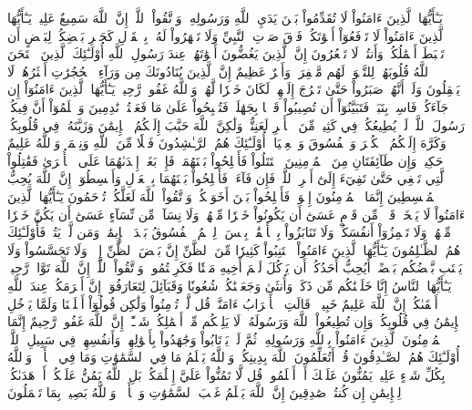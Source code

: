 يَـٰٓأَيُّهَا ٱلَّذِينَ ءَامَنُواْ لَا تُقَدِّمُواْ بَيۡنَ يَدَيِ ٱللَّهِ وَرَسُولِهِۦۖ وَٱتَّقُواْ ٱللَّهَۚ إِنَّ ٱللَّهَ سَمِيعٌ عَلِيمٞ
يَـٰٓأَيُّهَا ٱلَّذِينَ ءَامَنُواْ لَا تَرۡفَعُوٓاْ أَصۡوَٰتَكُمۡ فَوۡقَ صَوۡتِ ٱلنَّبِيِّ وَلَا تَجۡهَرُواْ لَهُۥ بِٱلۡقَوۡلِ كَجَهۡرِ بَعۡضِكُمۡ لِبَعۡضٍ أَن تَحۡبَطَ أَعۡمَٰلُكُمۡ وَأَنتُمۡ لَا تَشۡعُرُونَ
إِنَّ ٱلَّذِينَ يَغُضُّونَ أَصۡوَٰتَهُمۡ عِندَ رَسُولِ ٱللَّهِ أُوْلَـٰٓئِكَ ٱلَّذِينَ ٱمۡتَحَنَ ٱللَّهُ قُلُوبَهُمۡ لِلتَّقۡوَىٰۚ لَهُم مَّغۡفِرَةٞ وَأَجۡرٌ عَظِيمٌ
إِنَّ ٱلَّذِينَ يُنَادُونَكَ مِن وَرَآءِ ٱلۡحُجُرَٰتِ أَكۡثَرُهُمۡ لَا يَعۡقِلُونَ
وَلَوۡ أَنَّهُمۡ صَبَرُواْ حَتَّىٰ تَخۡرُجَ إِلَيۡهِمۡ لَكَانَ خَيۡرٗا لَّهُمۡۚ وَٱللَّهُ غَفُورٞ رَّحِيمٞ
يَـٰٓأَيُّهَا ٱلَّذِينَ ءَامَنُوٓاْ إِن جَآءَكُمۡ فَاسِقُۢ بِنَبَإٖ فَتَبَيَّنُوٓاْ أَن تُصِيبُواْ قَوۡمَۢا بِجَهَٰلَةٖ فَتُصۡبِحُواْ عَلَىٰ مَا فَعَلۡتُمۡ نَٰدِمِينَ
وَٱعۡلَمُوٓاْ أَنَّ فِيكُمۡ رَسُولَ ٱللَّهِۚ لَوۡ يُطِيعُكُمۡ فِي كَثِيرٖ مِّنَ ٱلۡأَمۡرِ لَعَنِتُّمۡ وَلَٰكِنَّ ٱللَّهَ حَبَّبَ إِلَيۡكُمُ ٱلۡإِيمَٰنَ وَزَيَّنَهُۥ فِي قُلُوبِكُمۡ وَكَرَّهَ إِلَيۡكُمُ ٱلۡكُفۡرَ وَٱلۡفُسُوقَ وَٱلۡعِصۡيَانَۚ أُوْلَـٰٓئِكَ هُمُ ٱلرَّـٰشِدُونَ
فَضۡلٗا مِّنَ ٱللَّهِ وَنِعۡمَةٗۚ وَٱللَّهُ عَلِيمٌ حَكِيمٞ
وَإِن طَآئِفَتَانِ مِنَ ٱلۡمُؤۡمِنِينَ ٱقۡتَتَلُواْ فَأَصۡلِحُواْ بَيۡنَهُمَاۖ فَإِنۢ بَغَتۡ إِحۡدَىٰهُمَا عَلَى ٱلۡأُخۡرَىٰ فَقَٰتِلُواْ ٱلَّتِي تَبۡغِي حَتَّىٰ تَفِيٓءَ إِلَىٰٓ أَمۡرِ ٱللَّهِۚ فَإِن فَآءَتۡ فَأَصۡلِحُواْ بَيۡنَهُمَا بِٱلۡعَدۡلِ وَأَقۡسِطُوٓاْۖ إِنَّ ٱللَّهَ يُحِبُّ ٱلۡمُقۡسِطِينَ
إِنَّمَا ٱلۡمُؤۡمِنُونَ إِخۡوَةٞ فَأَصۡلِحُواْ بَيۡنَ أَخَوَيۡكُمۡۚ وَٱتَّقُواْ ٱللَّهَ لَعَلَّكُمۡ تُرۡحَمُونَ
يَـٰٓأَيُّهَا ٱلَّذِينَ ءَامَنُواْ لَا يَسۡخَرۡ قَوۡمٞ مِّن قَوۡمٍ عَسَىٰٓ أَن يَكُونُواْ خَيۡرٗا مِّنۡهُمۡ وَلَا نِسَآءٞ مِّن نِّسَآءٍ عَسَىٰٓ أَن يَكُنَّ خَيۡرٗا مِّنۡهُنَّۖ وَلَا تَلۡمِزُوٓاْ أَنفُسَكُمۡ وَلَا تَنَابَزُواْ بِٱلۡأَلۡقَٰبِۖ بِئۡسَ ٱلِٱسۡمُ ٱلۡفُسُوقُ بَعۡدَ ٱلۡإِيمَٰنِۚ وَمَن لَّمۡ يَتُبۡ فَأُوْلَـٰٓئِكَ هُمُ ٱلظَّـٰلِمُونَ
يَـٰٓأَيُّهَا ٱلَّذِينَ ءَامَنُواْ ٱجۡتَنِبُواْ كَثِيرٗا مِّنَ ٱلظَّنِّ إِنَّ بَعۡضَ ٱلظَّنِّ إِثۡمٞۖ وَلَا تَجَسَّسُواْ وَلَا يَغۡتَب بَّعۡضُكُم بَعۡضًاۚ أَيُحِبُّ أَحَدُكُمۡ أَن يَأۡكُلَ لَحۡمَ أَخِيهِ مَيۡتٗا فَكَرِهۡتُمُوهُۚ وَٱتَّقُواْ ٱللَّهَۚ إِنَّ ٱللَّهَ تَوَّابٞ رَّحِيمٞ
يَـٰٓأَيُّهَا ٱلنَّاسُ إِنَّا خَلَقۡنَٰكُم مِّن ذَكَرٖ وَأُنثَىٰ وَجَعَلۡنَٰكُمۡ شُعُوبٗا وَقَبَآئِلَ لِتَعَارَفُوٓاْۚ إِنَّ أَكۡرَمَكُمۡ عِندَ ٱللَّهِ أَتۡقَىٰكُمۡۚ إِنَّ ٱللَّهَ عَلِيمٌ خَبِيرٞ
۞قَالَتِ ٱلۡأَعۡرَابُ ءَامَنَّاۖ قُل لَّمۡ تُؤۡمِنُواْ وَلَٰكِن قُولُوٓاْ أَسۡلَمۡنَا وَلَمَّا يَدۡخُلِ ٱلۡإِيمَٰنُ فِي قُلُوبِكُمۡۖ وَإِن تُطِيعُواْ ٱللَّهَ وَرَسُولَهُۥ لَا يَلِتۡكُم مِّنۡ أَعۡمَٰلِكُمۡ شَيۡـًٔاۚ إِنَّ ٱللَّهَ غَفُورٞ رَّحِيمٌ
إِنَّمَا ٱلۡمُؤۡمِنُونَ ٱلَّذِينَ ءَامَنُواْ بِٱللَّهِ وَرَسُولِهِۦ ثُمَّ لَمۡ يَرۡتَابُواْ وَجَٰهَدُواْ بِأَمۡوَٰلِهِمۡ وَأَنفُسِهِمۡ فِي سَبِيلِ ٱللَّهِۚ أُوْلَـٰٓئِكَ هُمُ ٱلصَّـٰدِقُونَ
قُلۡ أَتُعَلِّمُونَ ٱللَّهَ بِدِينِكُمۡ وَٱللَّهُ يَعۡلَمُ مَا فِي ٱلسَّمَٰوَٰتِ وَمَا فِي ٱلۡأَرۡضِۚ وَٱللَّهُ بِكُلِّ شَيۡءٍ عَلِيمٞ
يَمُنُّونَ عَلَيۡكَ أَنۡ أَسۡلَمُواْۖ قُل لَّا تَمُنُّواْ عَلَيَّ إِسۡلَٰمَكُمۖ بَلِ ٱللَّهُ يَمُنُّ عَلَيۡكُمۡ أَنۡ هَدَىٰكُمۡ لِلۡإِيمَٰنِ إِن كُنتُمۡ صَٰدِقِينَ
إِنَّ ٱللَّهَ يَعۡلَمُ غَيۡبَ ٱلسَّمَٰوَٰتِ وَٱلۡأَرۡضِۚ وَٱللَّهُ بَصِيرُۢ بِمَا تَعۡمَلُونَ